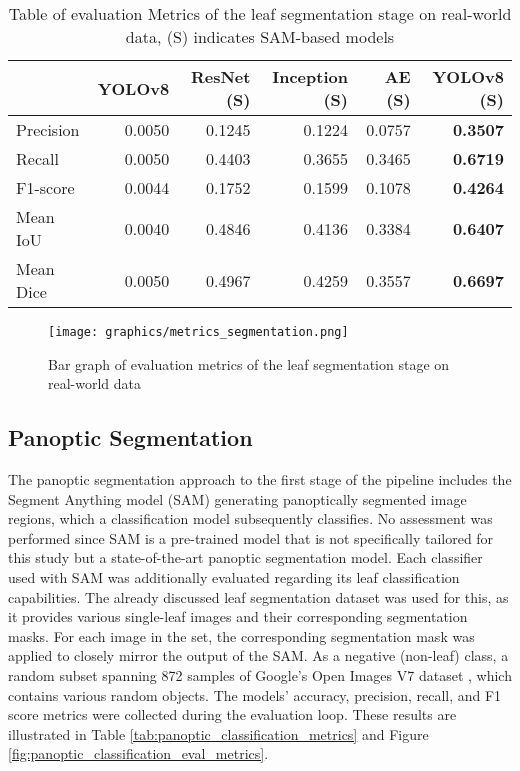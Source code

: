 \documentclass[draft,final]{vutinfth} %
\begin{document}
\begin{table}[]
    \centering
    \begin{tabular}{lrrrrr}
    \toprule
     & YOLOv8 & ResNet (S) & Inception (S) & AE (S) & YOLOv8 (S) \\
    \midrule
    Precision & 0.0050 & 0.1245 & 0.1224 & 0.0757 & \textbf{0.3507} \\
    Recall & 0.0050 & 0.4403 & 0.3655 & 0.3465 & \textbf{0.6719} \\
    F1-score & 0.0044 & 0.1752 & 0.1599 & 0.1078 & \textbf{0.4264} \\
    Mean IoU & 0.0040 & 0.4846 & 0.4136 & 0.3384 & \textbf{0.6407} \\
    Mean Dice & 0.0050 & 0.4967 & 0.4259 & 0.3557 & \textbf{0.6697} \\
    \bottomrule
    \end{tabular}
    \caption{Table of evaluation Metrics of the leaf segmentation stage on real-world data, (S) indicates SAM-based models}
    \label{tab:metrics_segmentation}
\end{table}

\begin{figure}
    \centering
    \texttt{[image: graphics/metrics\_segmentation.png]}
    \caption{Bar graph of evaluation metrics of the leaf segmentation stage on real-world data}
    \label{fig:metrics_segmentation}
\end{figure}

\subsection{Panoptic Segmentation} \label{sec:results_segmentation_panoptic}
The panoptic segmentation approach to the first stage of the pipeline includes the Segment Anything model (SAM) \cite{kirillov_segment_2023} generating panoptically segmented image regions, which a classification model subsequently classifies. 
No assessment was performed since SAM is a pre-trained model that is not specifically tailored for this study but a state-of-the-art panoptic segmentation model.
Each classifier used with SAM was additionally evaluated regarding its leaf classification capabilities. The already discussed leaf segmentation dataset \cite{giovi_leaf_2024} was used for this, as it provides various single-leaf images and their corresponding segmentation masks. For each image in the set, the corresponding segmentation mask was applied to closely mirror the output of the SAM. As a negative (non-leaf) class, a random subset spanning 872 samples of Google's Open Images V7 dataset \cite{kuznetsova_open_2020}, which contains various random objects. 
The models' accuracy, precision, recall, and F1 score metrics were collected during the evaluation loop. These results are illustrated in Table \ref{tab:panoptic_classification_metrics} and Figure \ref{fig:panoptic_classification_eval_metrics}. 
\end{document}
